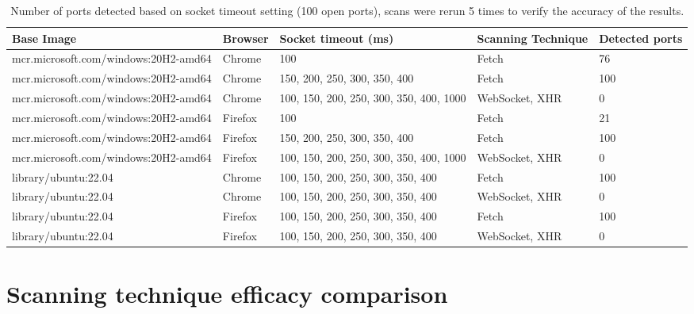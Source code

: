 \begin{table}[htbp]
\footnotesize
\centering
\begin{adjustwidth}{-1.0cm}{}
\begin{tabular}{p{6.3cm}p{1.5cm}p{3cm}p{2cm}p{2cm}}
    \toprule
    Base Image & Browser & Socket timeout (ms) & Scanning Technique & Detected ports \\
     \midrule
    mcr.microsoft.com/windows:20H2-amd64 & Chrome & 100 & Fetch & 76 \\
    mcr.microsoft.com/windows:20H2-amd64 & Chrome & 150, 200, 250, 300, 350, 400 & Fetch & 100 \\
    mcr.microsoft.com/windows:20H2-amd64 & Chrome & 100, 150, 200, 250, 300, 350, 400, 1000 & WebSocket, XHR & 0 \\
    \midrule
    mcr.microsoft.com/windows:20H2-amd64 & Firefox & 100 & Fetch & 21 \\
    mcr.microsoft.com/windows:20H2-amd64 & Firefox & 150, 200, 250, 300, 350, 400 & Fetch & 100 \\
    mcr.microsoft.com/windows:20H2-amd64 & Firefox & 100, 150, 200, 250, 300, 350, 400, 1000 & WebSocket, XHR & 0 \\
    \midrule
    library/ubuntu:22.04 & Chrome & 100, 150, 200, 250, 300, 350, 400 & Fetch & 100 \\
    library/ubuntu:22.04 & Chrome & 100, 150, 200, 250, 300, 350, 400 & WebSocket, XHR & 0 \\
    \midrule
    library/ubuntu:22.04 & Firefox & 100, 150, 200, 250, 300, 350, 400 & Fetch & 100 \\
    library/ubuntu:22.04 & Firefox & 100, 150, 200, 250, 300, 350, 400 & WebSocket, XHR & 0 \\
     \bottomrule
\end{tabular}
\end{adjustwidth}{}
\caption{Number of ports detected based on socket timeout setting (100 open ports), scans were rerun 5 times to verify the accuracy of the results.}
\label{tab:socket-timeout-comparison}
\end{table}
\clearpage


\section{Scanning technique efficacy comparison}

